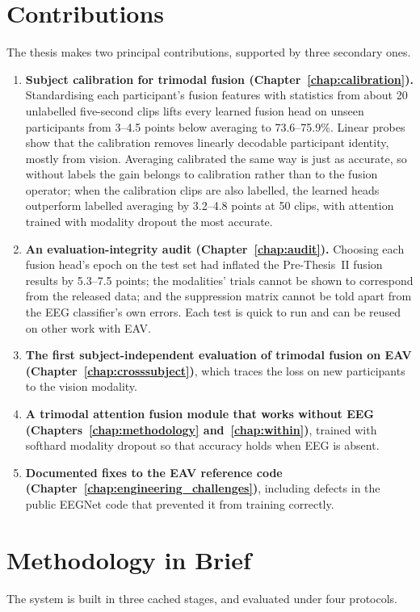 \section{Contributions}
\label{sec:contributions_intro}
The thesis makes two principal contributions, supported by three secondary ones.

\begin{enumerate}
    \item \textbf{Subject calibration for trimodal fusion (Chapter~\ref{chap:calibration}).} Standardising each participant's fusion features with statistics from about 20 unlabelled five-second clips lifts every learned fusion head on unseen participants from 3--4.5 points below averaging to 73.6--75.9\%. Linear probes show that the calibration removes linearly decodable participant identity, mostly from vision. Averaging calibrated the same way is just as accurate, so without labels the gain belongs to calibration rather than to the fusion operator; when the calibration clips are also labelled, the learned heads outperform labelled averaging by 3.2--4.8 points at 50 clips, with attention trained with modality dropout the most accurate.
    \item \textbf{An evaluation-integrity audit (Chapter~\ref{chap:audit}).} Choosing each fusion head's epoch on the test set had inflated the Pre-Thesis~II fusion results by 5.3--7.5 points; the modalities' trials cannot be shown to correspond from the released data; and the suppression matrix cannot be told apart from the EEG classifier's own errors. Each test is quick to run and can be reused on other work with EAV.
    \item \textbf{The first subject-independent evaluation of trimodal fusion on EAV (Chapter~\ref{chap:crosssubject})}, which traces the loss on new participants to the vision modality.
    \item \textbf{A trimodal attention fusion module that works without EEG (Chapters~\ref{chap:methodology} and~\ref{chap:within})}, trained with softhard modality dropout so that accuracy holds when EEG is absent.
    \item \textbf{Documented fixes to the EAV reference code (Chapter~\ref{chap:engineering_challenges})}, including defects in the public EEGNet code that prevented it from training correctly.
\end{enumerate}

\section{Methodology in Brief}
The system is built in three cached stages, and evaluated under four protocols.

